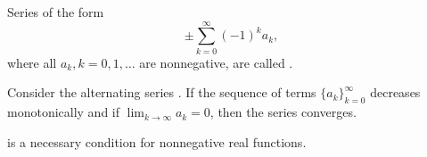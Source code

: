 \begin{definition}\label{def:alternating_series}
  Series of the form
  \begin{equation}\label{def:alternating_series/series}
    \pm \sum_{k=0}^\infty (-1)^k a_k,
  \end{equation}
  where all \( a_k, k = 0, 1, \ldots \) are nonnegative, are called .
\end{definition}

\begin{proposition}\label{leibniz_alternating_series_test}
  Consider the alternating series . If the sequence of terms \( \{ a_k \}_{k=0}^\infty \) decreases monotonically and if \( \lim_{k \to \infty} a_k = 0 \), then the series converges.
\end{proposition}

\begin{theorem}\label{thm:weierstrass_series_criterion_nessessity}\mcite\cite[]{Фихтенгольц1968/2}
   is a necessary condition for nonnegative real functions.
\end{theorem}
